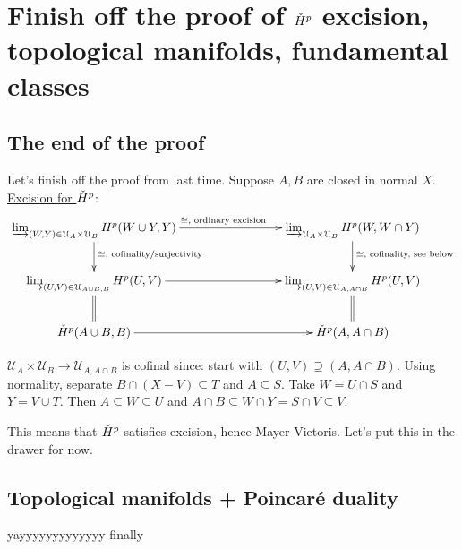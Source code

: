 \section{Finish off the proof of $\check{H}^p$ excision, topological manifolds, fundamental classes}
\subsection{The end of the proof}
Let's finish off the proof from last time. Suppose $A,B$ are closed in normal $X$. \underline{Excision for $\check{H}^p$}:
\begin{equation*}
\xymatrix{
	\varinjlim_{(W,Y)\in\mathcal{U}_A\times\mathcal{U}_B}H^p(W\cup Y,Y)\ar[rrr]^{\cong,\text{ ordinary excision}}\ar[d]^{\cong,\text{ cofinality/surjectivity}} & & & \varinjlim_{\mathcal{U}_A\times\mathcal{U}_B}H^p(W,W\cap Y)\ar[d]^{\cong,\text{ cofinality, see below}}\\
	\varinjlim_{(U,V)\in\mathcal{U}_{A\cup B,B}}H^p(U,V)\ar[rrr]\ar@{=}[d] & & & \varinjlim_{(U,V)\in\mathcal{U}_{A,A\cap B}}H^p(U,V)\ar@{=}[d]\\
	\cHH^p(A\cup B,B)\ar[rrr] & & & \cHH^p(A,A\cap B)
}
\end{equation*}

$\mathcal{U}_A\times\mathcal{U}_B\to\mathcal{U}_{A,A\cap B}$ is cofinal since: start with $(U,V)\supseteq(A,A\cap B)$. Using normality, separate $B\cap(X-V)\subseteq T$ and $A\subseteq S$. Take $W=U\cap S$ and $Y=V\cup T$. Then $A\subseteq W\subseteq U$ and $A\cap B\subseteq W\cap Y=S\cap V\subseteq V$.

This means that $\check{H}^p$ satisfies excision, hence Mayer-Vietoris. Let's put this in the drawer for now.
\subsection{Topological manifolds + Poincar\'{e} duality}
yayyyyyyyyyyyyy finally
